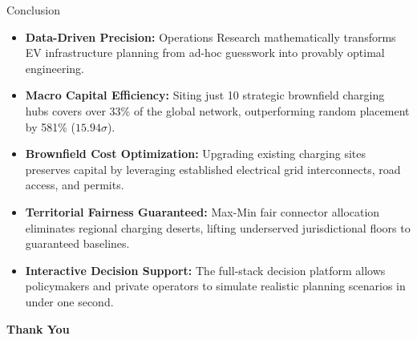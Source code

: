 \documentclass[aspectratio=169,10pt]{beamer}
\begin{document}
\begin{frame}{Conclusion}
  \vspace{0.3cm}
  \begin{itemize}\setlength{\itemsep}{0.42cm}
    \item \textbf{Data-Driven Precision:} Operations Research mathematically transforms EV infrastructure planning from ad-hoc guesswork into provably optimal engineering.
    \item \textbf{Macro Capital Efficiency:} Siting just 10 strategic brownfield charging hubs covers over 33\% of the global network, outperforming random placement by 581\% ($15.94\sigma$).
    \item \textbf{Brownfield Cost Optimization:} Upgrading existing charging sites preserves capital by leveraging established electrical grid interconnects, road access, and permits.
    \item \textbf{Territorial Fairness Guaranteed:} Max-Min fair connector allocation eliminates regional charging deserts, lifting underserved jurisdictional floors to guaranteed baselines.
    \item \textbf{Interactive Decision Support:} The full-stack decision platform allows policymakers and private operators to simulate realistic planning scenarios in under one second.
  \end{itemize}
\end{frame}

\begin{frame}[plain]
  \centering
  \vspace{3.0cm}
  {\Huge\bfseries\color{white} Thank You\par}
\end{frame}
\end{document}
